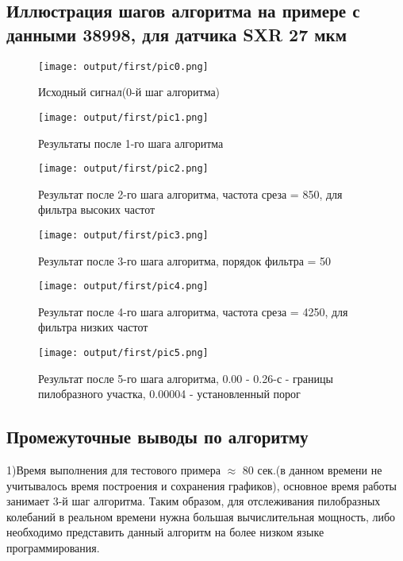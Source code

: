 \documentclass[a4]{article}
\begin{document}
	\subsection{Иллюстрация шагов алгоритма на примере с данными 38998, для датчика SXR 27 мкм}
		\begin{center}
			\newpage
			\begin{figure}[h!]
				\texttt{[image: output/first/pic0.png]}\caption[Исходный сигнал(0-й шаг алгоритма)]{Исходный сигнал(0-й шаг алгоритма)}
			\end{figure}
			\newpage
			\begin{figure}[h!]
				\texttt{[image: output/first/pic1.png]}\caption[Результаты после 1-го шага алгоритма]{Результаты после 1-го шага алгоритма}
			\end{figure}
		\newpage
			\begin{figure}[h!]
				\texttt{[image: output/first/pic2.png]}\caption[Результат после 2-го шага алгоритма, частота среза = 850, для фильтра высоких частот]{Результат после 2-го шага алгоритма, частота среза = 850, для фильтра высоких частот}
			\end{figure}
			\newpage
			\begin{figure}[h!]
				\texttt{[image: output/first/pic3.png]}\caption[Результат после 3-го шага алгоритма, порядок фильтра = 50]{Результат после 3-го шага алгоритма, порядок фильтра = 50}
			\end{figure}
			\newpage
			\begin{figure}[h!]
				\texttt{[image: output/first/pic4.png]}\caption[Результат после 4-го шага алгоритма, частота среза = 4250, для фильтра низких частот]{Результат после 4-го шага алгоритма, частота среза = 4250, для фильтра низких частот}
			\end{figure}
		\newpage
			\begin{figure}[h!]
				\texttt{[image: output/first/pic5.png]}\caption[Результат после 5-го шага алгоритма, 0.00 - 0.26-с - границы пилобразного участка, 0.00004 - установленный порог]{Результат после 5-го шага алгоритма, 0.00 - 0.26-с - границы пилобразного участка, 0.00004 - установленный порог}
			\end{figure}
				
		\end{center}
		\newpage
		\subsection{Промежуточные выводы по алгоритму}
			1)Время выполнения для тестового примера $\approx$ 80 сек.(в данном времени не учитывалось время построения и сохранения графиков), основное время работы занимает 3-й шаг алгоритма. Таким образом, для отслеживания пилобразных колебаний в реальном времени нужна большая вычислительная мощность, либо необходимо представить данный алгоритм на более низком языке программирования.\\
			
\end{document}
